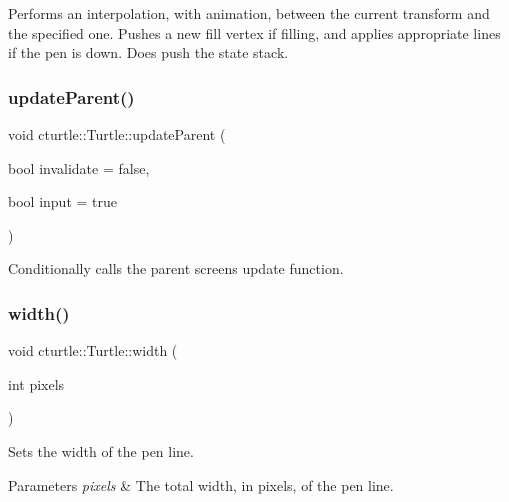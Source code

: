 Performs an interpolation, with animation, between the current transform and the specified one. Pushes a new fill vertex if filling, and applies appropriate lines if the pen is down. Does push the state stack. \mbox{\label{classcturtle_1_1Turtle_ada9ddbc87c2c9baaf2f1a1051acc3851}} 
\subsubsection{\texorpdfstring{update\+Parent()}{updateParent()}}
{\footnotesize\ttfamily void cturtle\+::\+Turtle\+::update\+Parent (\begin{DoxyParamCaption}\item[{bool}]{invalidate = {\ttfamily false},  }\item[{bool}]{input = {\ttfamily true} }\end{DoxyParamCaption})\hspace{0.3cm}{\ttfamily [protected]}}

Conditionally calls the parent screen\textquotesingle{}s update function. \mbox{\label{classcturtle_1_1Turtle_a1b5378167a4425fa721552bab0402afc}} 
\subsubsection{\texorpdfstring{width()}{width()}\hspace{0.1cm}{\footnotesize\ttfamily [1/2]}}
{\footnotesize\ttfamily void cturtle\+::\+Turtle\+::width (\begin{DoxyParamCaption}\item[{int}]{pixels }\end{DoxyParamCaption})\hspace{0.3cm}{\ttfamily [inline]}}

Sets the width of the pen line. 
\begin{DoxyParams}{Parameters}
{\em pixels} & The total width, in pixels, of the pen line. \\
\hline
\end{DoxyParams}
\mbox{\label{classcturtle_1_1Turtle_af45bb9721decb8f091622863d337e9af}} 
